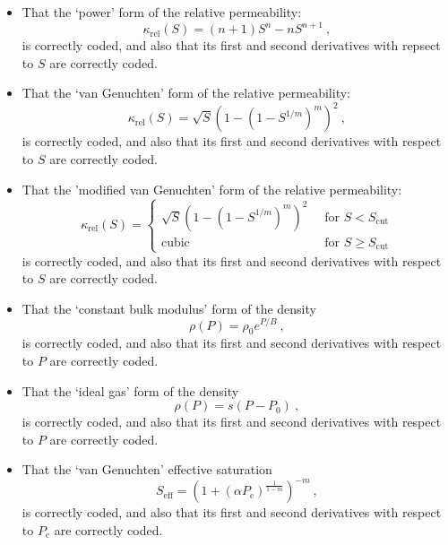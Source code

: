 \documentclass[]{scrreprt}
\begin{document}
\begin{itemize}

\item That the `power' form of the relative permeability:
\begin{equation}
\kappa_{\mathrm{rel}}(S) = (n+1)S^{n} - nS^{n+1} \ ,
\end{equation}
is correctly coded, and also that its first and second derivatives
with repsect to $S$ are correctly coded.

\item That the `van Genuchten' form of the relative permeability:
\begin{equation}
\kappa_{\mathrm{rel}}(S) = \sqrt{S}\left(1 - \left(1 -
S^{1/m}\right)^{m}\right)^{2} \ ,
\end{equation}
is correctly coded, and also that its first and second derivatives
with respect to $S$ are correctly coded.

\item That the 'modified van Genuchten' form of the relative permeability:
\begin{equation}
\kappa_{\mathrm{rel}}(S) = \left\{
\begin{array}{ll}
\sqrt{S}\left(1 - \left(1 -
S^{1/m}\right)^{m}\right)^{2} \ & \mbox{ for } S<S_{\mathrm{cut}} \\
\mbox{cubic} \ & \mbox{ for } S \geq S_{\mathrm{cut}}
\end{array}
\right.
\end{equation}
is correctly coded, and also that its first and second derivatives
with respect to $S$ are correctly coded.

\item That the `constant bulk modulus' form of the density
\begin{equation}
\rho(P) = \rho_{0}e^{P/B} \ ,
\end{equation}
is correctly coded, and also that its first and second derivatives
with respect to $P$ are correctly coded.

\item That the `ideal gas' form of the density
\begin{equation}
\rho(P) = s(P-P_{\mathrm{0}}) \ ,
\end{equation}
is correctly coded, and also that its first and second derivatives
with respect to $P$ are correctly coded.

\item That the `van Genuchten' effective saturation
\begin{equation}
S_{\mathrm{eff}} = \left(1 + (\alpha
P_{\mathrm{c}})^{\frac{1}{1-m}}\right)^{-m} \ ,
\end{equation}
is correctly coded, and also that its first and second derivatives
with respect to $P_{\mathrm{c}}$ are correctly coded.

\end{itemize}
\end{document}
